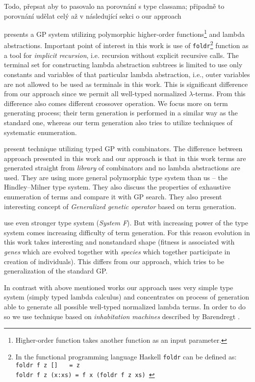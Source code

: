 \documentclass[11pt]{article}
\newcommand{\lterms}{$\lambda$-terms\xspace}
\newcommand{\red}[1]{{\color{red} #1}}
\begin{document}
\begin{article}
\red{Todo, přepsat aby to pasovalo na porovnání s type classama; připadně to porovnání udělat celý až v následující sekci o our approach}


\cite{yu01} presents a GP system utilizing
polymorphic higher-order functions\footnote{Higher-order 
function takes another function as an input parameter.
} and lambda abstractions.
Important point of interest in this work is use of \texttt{foldr}\footnote{ In the functional programming language Haskell \texttt{foldr} can be defined as:\\ \texttt{foldr f z [] $~~~$  = z\\ 
foldr f z (x:xs) = f x (foldr f z xs) }} function as a tool for \textit{implicit recursion},
i.e. recursion without explicit recursive calls. 
The terminal set for constructing lambda abstraction subtrees 
is limited to use only constants and variables of that particular
lambda abstraction, i.e., outer variables are not allowed to be used
as terminals in this work. This is significant difference from our approach 
since we permit all well-typed normalized \lterms. From this difference also
comes different crossover operation. We focus more on term generating process; 
their term generation is performed in a similar way as the standard one, 
whereas our term generation also tries to utilize techniques of systematic enumeration. 

\cite{kes} present technique 
utilizing typed GP with combinators.
The difference between approach presented in this work
and our approach is that in this work terms are generated
straight from \textit{library} of combinators and no lambda abstractions
are used. They are using more general polymorphic type system than us
-- the Hindley–Milner type system. They also discuss the 
properties of exhaustive enumeration of terms and compare it with GP search.  
They also present interesting concept of \textit{Generalized
genetic operator} based on term generation. 

\cite{binard2008genetic} use even 
stronger type system (\textit{System F}).  
But with increasing power of the type system comes increasing difficulty of term generation.
For this reason evolution in this work takes interesting and nonstandard shape 
(fitness is associated with \textit{genes} which are evolved together with \textit{species}
which together participate in creation of individuals).
This differs from our approach, which tries to be generalization of
the standard GP\citep{koza92}.

In contrast with above mentioned works our approach uses very simple type system 
(simply typed lambda calculus) and concentrates on process of generation  
able to generate all possible well-typed normalized lambda terms. In order to do
so we use technique based on \textit{inhabitation machines} 
described by Barendregt \cite{barendregt10}.    





\end{article}
\end{document}
